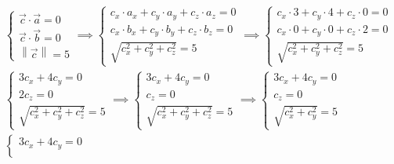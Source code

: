 \documentclass{article}
\newcommand{\norm}[1]{\left\lVert#1\right\rVert}
\begin{document}
\begin{enumerate}
          \begin{align*}
               & \begin{cases}
                     \vec{c} \cdot \vec{a} = 0 \\
                     \vec{c} \cdot \vec{b} = 0 \\
                     \norm{\vec{c}} = 5
                 \end{cases}
              \implies
              \begin{cases}
                  c_x \cdot a_x + c_y \cdot a_y + c_z \cdot a_z = 0 \\
                  c_x \cdot b_x + c_y \cdot b_y + c_z \cdot b_z = 0 \\
                  \sqrt{c_x^2 + c_y^2 + c_z^2} = 5
              \end{cases}
              \implies
              \begin{cases}
                  c_x \cdot 3 + c_y \cdot 4 + c_z \cdot 0 = 0 \\
                  c_x \cdot 0 + c_y \cdot 0 + c_z \cdot 2 = 0 \\
                  \sqrt{c_x^2 + c_y^2 + c_z^2} = 5
              \end{cases} \\
               & \begin{cases}
                     3c_x + 4c_y = 0 \\
                     2c_z = 0        \\
                     \sqrt{c_x^2 + c_y^2 + c_z^2} = 5
                 \end{cases}
              \implies
              \begin{cases}
                  3c_x + 4c_y = 0 \\
                  c_z = 0         \\
                  \sqrt{c_x^2 + c_y^2 + c_z^2} = 5
              \end{cases}
              \implies
              \begin{cases}
                  3c_x + 4c_y = 0 \\
                  c_z = 0         \\
                  \sqrt{c_x^2 + c_y^2} = 5
              \end{cases}                     \\
               & \begin{cases}
                     3c_x + 4c_y = 0 \\

\end{cases}
\end{align*}
\end{enumerate}
\end{document}
